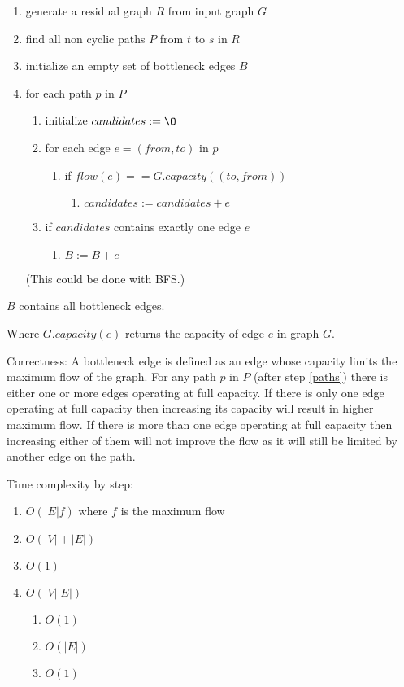 \documentclass[12pt]{article}
\begin{document}
\begin{enumerate}
	\item generate a residual graph $R$ from input graph $G$
	\item find all non cyclic paths $P$ from $t$ to $s$ in $R$ \label{paths}
	\item initialize an empty set of bottleneck edges $B$
	\item for each path $p$ in $P$
		\begin{enumerate}
			\item initialize $candidates := \O$
			\item for each edge $e = (from, to)$ in $p$
			\begin{enumerate}
				\item if $flow(e) == G.capacity((to, from))$
				\begin{enumerate}
					\item $candidates := candidates + e$
				\end{enumerate}
			\end{enumerate}
			\item if $candidates$ contains exactly one edge $e$
			\begin{enumerate}
				\item $B := B + e$
			\end{enumerate}
		\end{enumerate}

	(This could be done with BFS.)
\end{enumerate}

$B$ contains all bottleneck edges.

Where $G.capacity(e)$ returns the capacity of edge $e$ in graph $G$.

Correctness: A bottleneck edge is defined as an edge whose capacity limits the maximum flow of the graph. For any path $p$ in $P$ (after step \ref{paths}) there is either one or more edges operating at full capacity. If there is only one edge operating at full capacity then increasing its capacity will result in higher maximum flow. If there is more than one edge operating at full capacity then increasing either of them will not improve the flow as it will still be limited by another edge on the path.

Time complexity by step:
\begin{enumerate}
	\item $O(|E|f)$ where $f$ is the maximum flow
	\item $O(|V| + |E|)$
	\item $O(1)$
	\item $O(|V||E|)$
	\begin{enumerate}
		\item $O(1)$
		\item $O(|E|)$
		\item $O(1)$
	\end{enumerate}
\end{enumerate}
\end{document}

